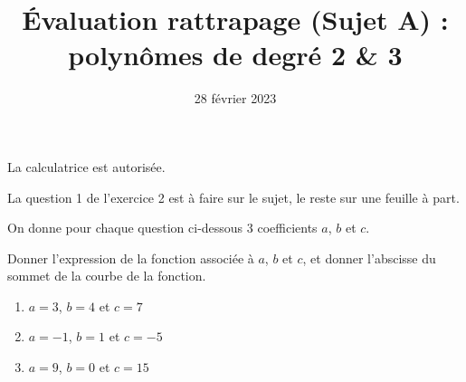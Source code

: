 \documentclass[
	classe=$1^{ere}STI2D$,
	headerTitle=Évaluation\space Chapitre\space 4
]{évaluation}
\date{28 février 2023}
\begin{document}
\title{Évaluation rattrapage (Sujet A) : polynômes de degré 2 \& 3}
\maketitle

\begin{tcolorbox}
	La calculatrice est autorisée.

	La question 1 de l'exercice 2 est à faire sur le sujet, le reste sur une feuille à part.
\end{tcolorbox}

\begin{exercice}
	On donne pour chaque question ci-dessous 3 coefficients $a$, $b$ et $c$.

	Donner l'expression de la fonction associée à $a$, $b$ et $c$, et donner l'abscisse du sommet de la courbe de la fonction.
	\begin{enumerate}
		\item $a = 3$, $b = 4$ et $c = 7$

		      \ifdefined{}\fi
		\item $a = -1$, $b = 1$ et $c = -5$

		      \ifdefined{}\fi
		\item $a = 9$, $b = 0$ et $c = 15$

		      \ifdefined{}\fi
	\end{enumerate}
\end{exercice}
\end{document}
